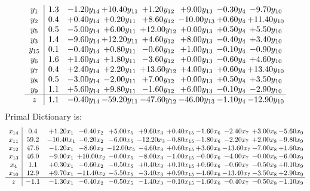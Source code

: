 \documentclass[9pt]{article}
\begin{document}
\[\begin{array}{c| c c@{\hskip 2pt} c@{\hskip 2pt} c@{\hskip 2pt} c@{\hskip 2pt} c@{\hskip 2pt} c@{\hskip 2pt} }
 y_{1}   &  1.3 & -1.20 y_{14} & + 10.40 y_{11} & +  1.20 y_{12} & +  9.00 y_{13} & -0.30 y_{4} & -9.70 y_{10}\\
 y_{2}   &  0.4 & +  0.40 y_{14} & +  0.20 y_{11} & +  8.60 y_{12} & -10.00 y_{13} & +  0.60 y_{4} & + 11.40 y_{10}\\
 y_{5}   &  0.5 & -5.00 y_{14} & +  6.00 y_{11} & + 12.00 y_{12} & +  0.00 y_{13} & +  0.50 y_{4} & +  5.50 y_{10}\\
 y_{3}   &  1.4 & -9.60 y_{14} & + 12.20 y_{11} & +  4.60 y_{12} & +  8.00 y_{13} & -0.40 y_{4} & +  3.40 y_{10}\\
 y_{15}   &  0.1 & -0.40 y_{14} & +  0.80 y_{11} & -0.60 y_{12} & +  1.00 y_{13} & -0.10 y_{4} & -0.90 y_{10}\\
 y_{6}   &  1.6 & +  1.60 y_{14} & +  1.80 y_{11} & -3.60 y_{12} & +  0.00 y_{13} & -0.60 y_{4} & +  4.60 y_{10}\\
 y_{7}   &  0.4 & +  2.40 y_{14} & +  2.20 y_{11} & + 13.60 y_{12} & +  4.00 y_{13} & +  0.60 y_{4} & + 13.40 y_{10}\\
 y_{8}   &  0.5 & -3.00 y_{14} & -2.00 y_{11} & +  7.00 y_{12} & +  0.00 y_{13} & +  0.50 y_{4} & +  3.50 y_{10}\\
 y_{9}   &  1.1 & +  5.60 y_{14} & +  9.80 y_{11} & -1.60 y_{12} & +  6.00 y_{13} & -0.10 y_{4} & -2.90 y_{10}\\
\hline
z    &  1.1 & -0.40 y_{14} & -59.20 y_{11} & -47.60 y_{12} & -46.00 y_{13} & -1.10 y_{4} & -12.90 y_{10}\\
\end{array}\]
Primal Dictionary is:
\[\begin{array}{c| c c@{\hskip 2pt} c@{\hskip 2pt} c@{\hskip 2pt} c@{\hskip 2pt} c@{\hskip 2pt} c@{\hskip 2pt} c@{\hskip 2pt} c@{\hskip 2pt} c@{\hskip 2pt} }
 x_{14}   &  0.4 & +  1.20 x_{1} & -0.40 x_{2} & +  5.00 x_{5} & +  9.60 x_{3} & +  0.40 x_{15} & -1.60 x_{6} & -2.40 x_{7} & +  3.00 x_{8} & -5.60 x_{9}\\
 x_{11}   &  59.2 & -10.40 x_{1} & -0.20 x_{2} & -6.00 x_{5} & -12.20 x_{3} & -0.80 x_{15} & -1.80 x_{6} & -2.20 x_{7} & +  2.00 x_{8} & -9.80 x_{9}\\
 x_{12}   &  47.6 & -1.20 x_{1} & -8.60 x_{2} & -12.00 x_{5} & -4.60 x_{3} & +  0.60 x_{15} & +  3.60 x_{6} & -13.60 x_{7} & -7.00 x_{8} & +  1.60 x_{9}\\
 x_{13}   &  46.0 & -9.00 x_{1} & + 10.00 x_{2} & -0.00 x_{5} & -8.00 x_{3} & -1.00 x_{15} & -0.00 x_{6} & -4.00 x_{7} & -0.00 x_{8} & -6.00 x_{9}\\
 x_{4}   &  1.1 & +  0.30 x_{1} & -0.60 x_{2} & -0.50 x_{5} & +  0.40 x_{3} & +  0.10 x_{15} & +  0.60 x_{6} & -0.60 x_{7} & -0.50 x_{8} & +  0.10 x_{9}\\
 x_{10}   &  12.9 & +  9.70 x_{1} & -11.40 x_{2} & -5.50 x_{5} & -3.40 x_{3} & +  0.90 x_{15} & -4.60 x_{6} & -13.40 x_{7} & -3.50 x_{8} & +  2.90 x_{9}\\
\hline
z    &  -1.1 & -1.30 x_{1} & -0.40 x_{2} & -0.50 x_{5} & -1.40 x_{3} & -0.10 x_{15} & -1.60 x_{6} & -0.40 x_{7} & -0.50 x_{8} & -1.10 x_{9}\\
\end{array}\]
\end{document}
